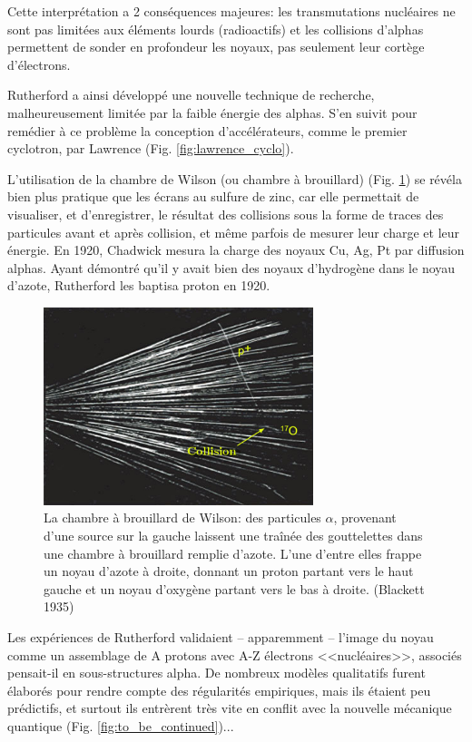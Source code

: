 Cette interprétation a 2 conséquences majeures: les transmutations nucléaires ne sont pas limitées aux éléments lourds (radioactifs) et les collisions d'alphas permettent de sonder en profondeur les noyaux, pas seulement leur cortège d'électrons.

Rutherford a ainsi développé une nouvelle technique de recherche, malheureusement limitée par la faible énergie des alphas. S'en suivit pour remédier à ce problème la conception d'accélérateurs, comme le premier cyclotron, par Lawrence (Fig. \ref{fig:lawrence_cyclo}).

L’utilisation de la chambre de Wilson (ou chambre à brouillard) (Fig. \ref{fig:chambre_wilson}) se révéla bien plus pratique que les écrans au sulfure de zinc, car elle permettait de visualiser, et d’enregistrer, le résultat des collisions sous la forme de traces des particules avant et après collision, et même parfois de mesurer leur charge et leur énergie. En 1920, Chadwick mesura la charge des noyaux Cu, Ag, Pt par diffusion alphas. Ayant démontré qu’il y avait bien des noyaux d’hydrogène dans le noyau d’azote, Rutherford les baptisa proton en 1920.

\begin{figure}[ht]
    \centering
    \includegraphics[width=0.7\textwidth]{Images1/collisions_alpha_proton.jpg}
    \caption{La chambre à brouillard de Wilson: des particules $\alpha$, provenant d'une source sur la gauche laissent une traînée des gouttelettes dans une chambre à brouillard remplie d'azote. L'une d'entre elles frappe un noyau d'azote à droite, donnant un proton partant vers le haut gauche et un noyau d'oxygène partant vers le bas à droite. (Blackett 1935)}
    \label{fig:chambre_wilson}
\end{figure}

Les expériences de Rutherford validaient -- apparemment -- l’image du noyau comme un assemblage de A protons avec A-Z électrons <<nucléaires>>, associés pensait-il en sous-structures alpha. De nombreux modèles qualitatifs furent élaborés pour rendre compte des régularités empiriques, mais ils étaient peu prédictifs, et surtout ils entrèrent très vite en conflit avec la nouvelle mécanique quantique (Fig. \ref{fig:to_be_continued})...

